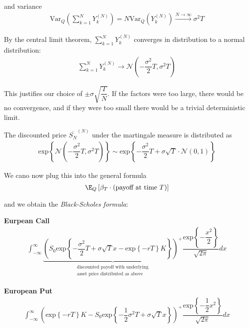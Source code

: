 \noindent and variance
\begin{equation*}
  \begin{gathered}
    \text{Var}_Q\left(\sum_{k=1}^{N}Y_k^{(N)}\right) = N\text{Var}_Q\left(Y_k^{(N)}\right)\stackrel{N\to\infty}{\rightarrow} \sigma^2T
  \end{gathered}
\end{equation*}\par
\noindent By the central limit theorem, $\sum_{k=1}^{N}Y_k^{(N)}$ converges in distribution to a normal distribution:
\begin{equation*}
  \begin{gathered}
    \sum_{k=1}^{N}Y_k^{(N)}\to\mathcal{N}\left(-\dfrac{\sigma^2}{2}T,\sigma^2T\right)
  \end{gathered}
\end{equation*}\par
\noindent This justifies our choice of $\pm\sigma\sqrt{\dfrac{T}{N}}$. If the factors were too large, there would be no convergence, and if they were too small there would be a trivial deterministic limit.
\par\bigskip
\noindent The discounted price $\overline{S_N}^{(N)}$ under the martingale measure is distributed as
\begin{equation*}
  \begin{gathered}
    \text{exp}\left\{\mathcal{N}\left(-\dfrac{\sigma^2}{2}T,\sigma^2T\right)\right\}\sim\text{exp}\left\{-\dfrac{\sigma^2}{2}T+\sigma\sqrt{T}\cdot\mathcal{N}(0,1)\right\}
  \end{gathered}
\end{equation*}
\par\bigskip
\noindent We cano now plug this into the general formula
\begin{equation*}
  \begin{gathered}
    \E_Q\left[\beta_T\cdot\text{(payoff at time $T$)}\right]
  \end{gathered}
\end{equation*}\par
\noindent and we obtain the \textit{Black-Scholes formula}:\par
\noindent\textbf{Eurpean Call}
\begin{equation*}
  \begin{gathered}
    \int_{-\infty}^{\infty}\underbrace{\left(S_0\text{exp}\left\{-\dfrac{\sigma^2}{2}T+\sigma\sqrt{T}x-\text{exp}\left\{-rT\right\}K\right\}\right)^+}_{\substack{\text{discounted payoff with underlying}\\\text{asset price distributed as above}}}\dfrac{\text{exp}\left\{-\dfrac{x^2}{2}\right\}}{\sqrt{2\pi}}dx
  \end{gathered}
\end{equation*}\par
\noindent\textbf{European Put}
\begin{equation*}
  \begin{gathered}
    \int_{-\infty}^{\infty}\left(\text{exp}\left\{-rT\right\}K-S_0\text{exp}\left\{-\dfrac{1}{2}\sigma^2T+\sigma\sqrt{T}x\right\}\right)^+\dfrac{\text{exp}\left\{-\dfrac{1}{2}x^2\right\}}{\sqrt{2\pi}}dx
  \end{gathered}
\end{equation*}
